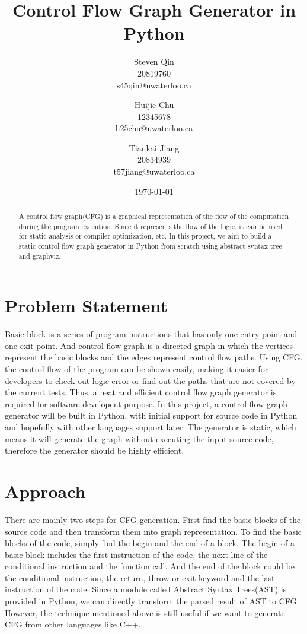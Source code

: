 \documentclass[11pt]{article}
\title{Control Flow Graph Generator in Python}
\author{Steven Qin\\20819760\\s45qin@uwaterloo.ca \and Huijie Chu\\12345678\\h25chu@uwaterloo.ca \and Tiankai Jiang\\20834939\\t57jiang@uwaterloo.ca}
\date{\today}
\begin{document}
\maketitle

\begin{abstract}
A control flow graph(CFG) is a graphical representation of the flow of the computation during the program execution. Since it represents the flow of the logic, it can be used for static analysis or compiler optimization, etc. In this project, we aim to build a static control flow graph generator in Python from scratch using abstract syntax tree and graphviz. 
\end{abstract}

\section{Problem Statement}\label{section-problemStatement}
Basic block is a series of program instructions that has only one entry point and one exit point. And control flow graph is a directed graph in which the vertices represent the basic blocks and the edges represent control flow paths. Using CFG, the control flow of the program can be shown easily, making it easier for developers to check out logic error or find out the paths that are not covered by the current tests. Thus, a neat and efficient control flow graph generator is required for software developent purpose. In this project, a control flow graph generator will be built in Python, with initial support for source code in Python and hopefully with other languages support later. The generator is static, which means it will generate the graph without executing the input source code, therefore the generator should be highly efficient.

\section{Approach}\label{section-approach}
There are mainly two steps for CFG generation. First find the basic blocks of the source code and then transform them into graph representation. To find the basic blocks of the code, simply find the begin and the end of a block. The begin of a basic block includes the first instruction of the code, the next line of the conditional instruction and the function call. And the end of the block could be the conditional instruction, the return, throw or exit keyword and the last instruction of the code. Since a module called Abstract Syntax Trees(AST) is provided in Python, we can directly transform the parsed result of AST to CFG. However, the technique mentioned above is still useful if we want to generate CFG from other languages like C++.
\end{document}

